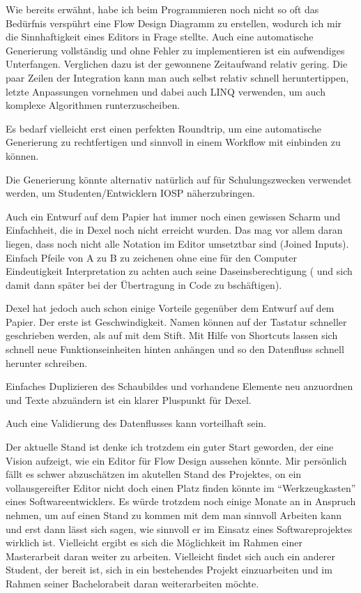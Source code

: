Wie bereits erwähnt, habe ich beim Programmieren noch nicht so oft das Bedürfnis verspührt eine Flow Design Diagramm zu erstellen, wodurch ich mir die Sinnhaftigkeit eines Editors in Frage stellte.
Auch eine automatische Generierung  vollständig und ohne Fehler zu implementieren ist ein aufwendiges Unterfangen. Verglichen dazu ist der gewonnene Zeitaufwand  relativ gering. Die paar Zeilen der Integration kann man auch selbst relativ schnell heruntertippen, letzte Anpassungen vornehmen und dabei  auch LINQ  verwenden, um  auch komplexe Algorithmen runterzuscheiben.

 Es bedarf vielleicht erst einen perfekten Roundtrip, um eine automatische Generierung zu rechtfertigen und sinnvoll in einem Workflow mit einbinden zu können.
 
 Die Generierung könnte alternativ natürlich auf für Schulungszwecken verwendet werden, um Studenten/Entwicklern IOSP näherzubringen.
 
Auch ein Entwurf auf dem Papier hat immer noch einen gewissen Scharm und Einfachheit, die in Dexel noch nicht erreicht wurden.
Das mag vor allem daran liegen, dass noch nicht alle Notation im Editor umsetztbar sind (Joined Inputs). Einfach Pfeile von A zu B zu zeichenen ohne eine für den Computer Eindeutigkeit Interpretation zu achten auch seine Daseinsberechtigung ( und sich damit dann später bei der Übertragung in Code zu bschäftigen).

Dexel hat jedoch auch schon einige Vorteile gegenüber dem Entwurf auf dem Papier. Der erste ist Geschwindigkeit. 
Namen können auf der Tastatur schneller geschrieben werden, als auf mit dem Stift. Mit Hilfe von Shortcuts lassen sich schnell neue Funktionseinheiten hinten anhängen und so den Datenfluss schnell herunter schreiben.

Einfaches Duplizieren des Schaubildes und vorhandene Elemente neu anzuordnen und Texte abzuändern ist ein klarer Pluspunkt für Dexel.

Auch eine Validierung des Datenflusses kann vorteilhaft sein.



Der aktuelle Stand ist denke ich trotzdem ein guter Start geworden, der eine Vision aufzeigt, wie ein Editor für Flow Design aussehen könnte.
Mir persönlich fällt es schwer abzuschätzen im akutellen Stand des Projektes, on ein vollausgereifter Editor nicht doch einen  Platz finden könnte im \enquote{Werkzeugkasten} eines Softwareentwicklers.
 Es würde trotzdem noch einige Monate an in Anspruch nehmen,  um auf einen Stand zu kommen mit dem man sinnvoll Arbeiten kann und erst dann lässt sich sagen, wie sinnvoll er im Einsatz eines Softwareprojektes wirklich ist.
  Vielleicht ergibt es sich die Möglichkeit  im Rahmen einer Masterarbeit daran weiter zu arbeiten. Vielleicht findet sich auch  ein anderer Student, der bereit ist, sich in ein bestehendes Projekt einzuarbeiten und im Rahmen seiner Bachelorabeit daran weiterarbeiten möchte.



